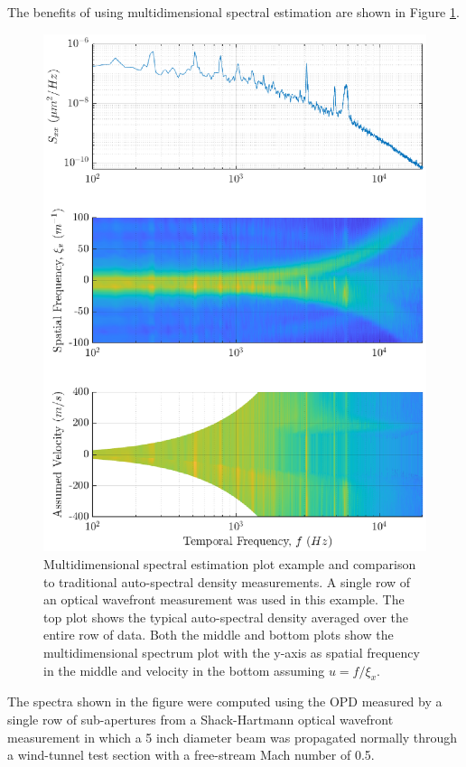 The benefits of using multidimensional spectral estimation are shown in Figure \ref{fig:04_dispersion_demo}.
\begin{figure}
\centering
  \includegraphics{../matlab/04_dispersion_analysis/dispersion_demo.eps}
  \caption{Multidimensional spectral estimation plot example and comparison to traditional auto-spectral density measurements. A single row of an optical wavefront measurement was used in this example. The top plot shows the typical auto-spectral density averaged over the entire row of data. Both the middle and bottom plots show the multidimensional spectrum plot with the y-axis as spatial frequency in the middle and velocity in the bottom assuming $u=f/\xi_x$.}
  \label{fig:04_dispersion_demo}
\end{figure}
The spectra shown in the figure were computed using the OPD measured by a single row of sub-apertures from a Shack-Hartmann optical wavefront measurement in which a 5 inch diameter beam was propagated normally through a wind-tunnel test section with a free-stream Mach number of 0.5.
